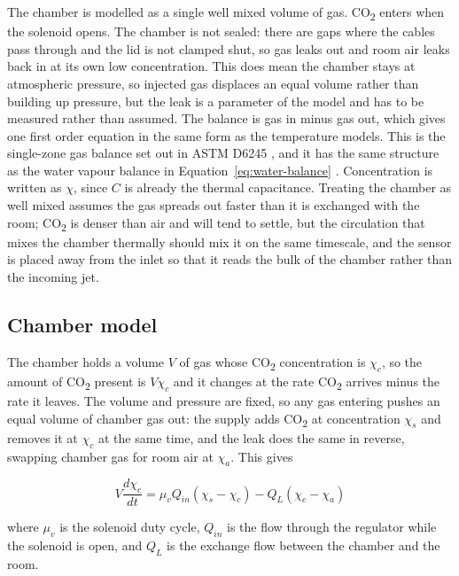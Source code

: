 The chamber is modelled as a single well mixed volume of gas. CO\textsubscript{2} enters when the solenoid opens. The chamber is not sealed: there are gaps where the cables pass through and the lid is not clamped shut, so gas leaks out and room air leaks back in at its own low concentration. This does mean the chamber stays at atmospheric pressure, so injected gas displaces an equal volume rather than building up pressure, but the leak is a parameter of the model and has to be measured rather than assumed. The balance is gas in minus gas out, which gives one first order equation in the same form as the temperature models. This is the single-zone gas balance set out in ASTM D6245 \citep{astm_d6245}, and it has the same structure as the water vapour balance in Equation~\ref{eq:water-balance} \citep{matamoros_temperature_2020}. Concentration is written as $\chi$, since $C$ is already the thermal capacitance. Treating the chamber as well mixed assumes the gas spreads out faster than it is exchanged with the room; CO\textsubscript{2} is denser than air and will tend to settle, but the circulation that mixes the chamber thermally should mix it on the same timescale, and the sensor is placed away from the inlet so that it reads the bulk of the chamber rather than the incoming jet.

\subsection{Chamber model}
\label{subsec:co2-chamber-model}

The chamber holds a volume $V$ of gas whose CO\textsubscript{2} concentration is $\chi_c$, so the amount of CO\textsubscript{2} present is $V\chi_c$ and it changes at the rate CO\textsubscript{2} arrives minus the rate it leaves. The volume and pressure are fixed, so any gas entering pushes an equal volume of chamber gas out: the supply adds CO\textsubscript{2} at concentration $\chi_s$ and removes it at $\chi_c$ at the same time, and the leak does the same in reverse, swapping chamber gas for room air at $\chi_a$. This gives

\begin{equation}
V \frac{d\chi_c}{dt} = \mu_v Q_{in} (\chi_s - \chi_c) - Q_L (\chi_c - \chi_a)
\label{eq:co2-balance}
\end{equation}

where $\mu_v$ is the solenoid duty cycle, $Q_{in}$ is the flow through the regulator while the solenoid is open, and $Q_L$ is the exchange flow between the chamber and the room.

